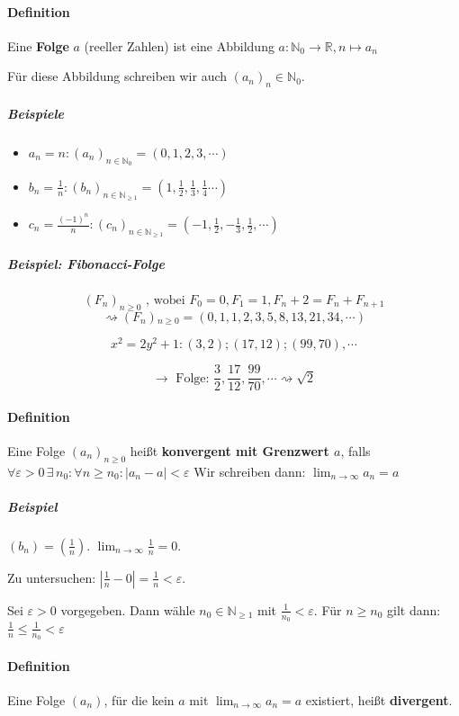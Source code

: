 \documentclass[14pt,a4paper]{article}
\newcommand{\N}{\ensuremath{\mathbb{N}}}
\newcommand{\Nzero}{\ensuremath{\N_0}}
\begin{document}
  \paragraph{Definition}
  Eine \textbf{Folge} $a$ (reeller Zahlen) ist eine Abbildung $ a : \Nzero
  \to \mathbb{R}, n \mapsto a_n $

  Für diese Abbildung schreiben wir auch $ (a_n)_n \in \Nzero$.


  \subparagraph{Beispiele}
  \begin{itemize}
    \item $a_n = n :  (a_n)_{n \in \Nzero}=(0,1,2,3,\dotsb)$
    \item $b_n = \frac{1}{n} : (b_n)_{n\in \N_{\geq 1}} = (1, \frac{1}{2},
        \frac{1}{3}, \frac{1}{4} \dotsb ) $
    \item $c_n = \frac{(-1)^n}{n} : (c_n)_{n \in \N_{\geq 1}} = (-1,
      \frac{1}{2}, -\frac{1}{3}, \frac{1}{2}, \dotsb)$
    \end{itemize}

    \subparagraph{Beispiel: Fibonacci-Folge}
    $$ (F_n)_{n \geq 0} \text{ , wobei } F_0=0, F_1=1, F_n+2 = F_n + F_{n+1} $$
    $$ \rightsquigarrow (F_n){_{n \geq 0}} = (0, 1, 1, 2, 3, 5, 8, 13, 21, 34,
    \dotsb)$$

    $$ x^2 = 2y^2 + 1 : (3,2); (17,12); (99,70), \dotsb $$

    $$ \rightarrow \text{ Folge: } \frac{3}{2}, \frac{17}{12}, \frac{99}{70},
    \dotsb \rightsquigarrow \sqrt{2} $$

    \paragraph{Definition}
    Eine Folge $(a_n)_{n \geq 0} $ heißt \textbf{konvergent mit Grenzwert $a$},
    falls $ \forall \varepsilon > 0 \,\exists\, n_0 : \forall n \geq n_0 : | a_n
    - a | < \varepsilon $
    Wir schreiben dann: $ \lim_{n \to \infty} a_n = a $

    \subparagraph{Beispiel}
    $ (b_n) = (\frac{1}{n}) $.
    $ \lim_{n \to \infty} \frac{1}{n} = 0 $.

    Zu untersuchen: $ | \frac{1}{n} - 0 | = \frac{1}{n} < \varepsilon $.

    Sei $\varepsilon > 0$ vorgegeben. Dann wähle $ n_0 \in \N_{\geq 1} $ mit
    $\frac{1}{n_0} < \varepsilon $. Für $n \geq n_0 $ gilt dann: $ \frac{1}{n}
    \leq \frac{1}{n_0} <  \varepsilon $

    \paragraph{Definition}
    Eine Folge $(a_n)$, für die kein $a$ mit $\lim_{n \to \infty} a_n = a$
    existiert, heißt \textbf{divergent}.
\end{document}
